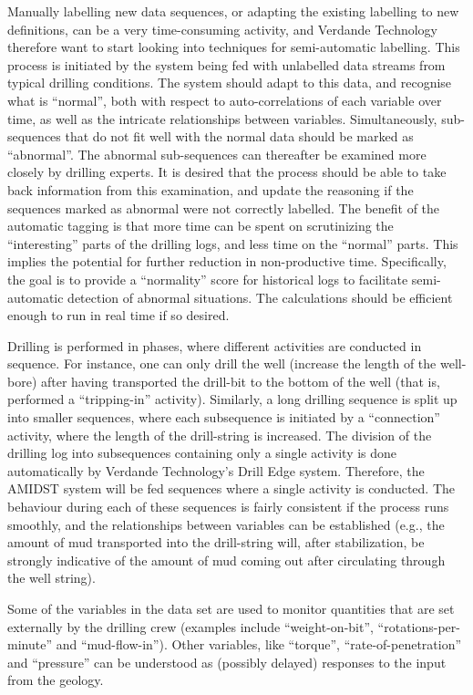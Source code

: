 Manually labelling new data sequences, or adapting the existing labelling to new definitions, can be a very time-consuming activity, and Verdande Technology therefore want to start looking into techniques for semi-automatic labelling.
This process is initiated by the system being fed with unlabelled data streams from typical drilling conditions. The system should adapt to this data, and recognise what is ``normal'', both with respect to auto-correlations of each variable over time, as well as the intricate relationships between variables. Simultaneously, sub-sequences that do not fit well with the normal data should be marked as ``abnormal''.
The abnormal sub-sequences can thereafter be examined more closely by drilling experts. It is desired that the process should be able to take back information from this examination, and update the reasoning if the sequences marked as abnormal were not correctly labelled. The benefit of the automatic tagging is that more time can be spent on scrutinizing the ``interesting'' parts of the drilling logs, and less time on the ``normal'' parts. 
This implies the potential for further reduction in non-productive time. Specifically, the goal is to provide a ``normality'' score for historical logs to facilitate semi-automatic detection of abnormal situations. The calculations should be efficient enough to run in real time if so desired.

Drilling is performed in phases, where different activities are conducted in sequence. For instance, one can only drill the well (increase the length of the well-bore) after having transported the drill-bit to the bottom of the well (that is, performed a ``tripping-in'' activity). Similarly, a long drilling sequence is split up into smaller sequences, where each subsequence is initiated by a ``connection'' activity, where the length of the drill-string is increased.
The division of the drilling log into subsequences containing only a single activity is done automatically by Verdande Technology's Drill Edge system. 
Therefore, the AMIDST system will be fed sequences where a single activity is conducted. 
The behaviour during each of these sequences  is fairly consistent if the process runs smoothly, and the relationships between variables can be established (e.g., the amount of mud transported into the drill-string will, after stabilization, be strongly indicative of the amount of mud coming out after circulating through the well string). 

Some of the variables in the data set are used to monitor quantities that are set externally by the drilling crew (examples include ``weight-on-bit'', ``rotations-per-minute'' and ``mud-flow-in''). Other variables, like ``torque'', ``rate-of-penetration'' and ``pressure'' can be understood as  (possibly delayed) responses to the input from the geology. 

